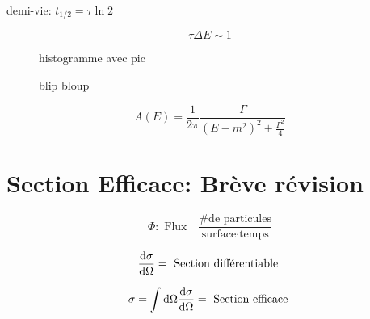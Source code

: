 demi-vie: $t_{1/2} = \tau \ln2$ 

$$\tau\Delta E \sim 1$$ 

\begin{figure}[ht]
    \centering
    \caption{histogramme avec pic}
    \label{fig:histogramme-avec-pic}
\end{figure}

\clearpage

\begin{figure}[ht]
    \centering
    \caption{blip bloup}
    \label{fig:blip-bloup}
\end{figure}

$$A(E) = \frac{1}{2\pi} \frac{\Gamma}{\left( E -m^2 \right)^2 + \frac{\Gamma^{2}}{4}  }$$ 


\section*{Section Efficace: Brève révision}


$$\Phi: \text{ Flux} \quad \frac{\text{\# de particules} }{\text{surface} \cdot \text{temps}  }  $$ 

$$\dv{\sigma}{\Omega} = \text{ Section différentiable } $$ 


$$\sigma = \int \dd \Omega \dv{\sigma}{\Omega} = \text{ Section efficace } $$ 



